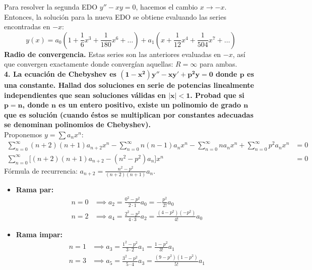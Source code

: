 \documentclass[11pt, a4paper]{article}
\begin{document}
Para resolver la segunda EDO $y''-xy=0$, hacemos el cambio $x \to -x$. Entonces, la solución para la nueva EDO se obtiene evaluando las series encontradas en $-x$:
\[
\boxed{y(x) = a_0\left(1 + \frac{1}{6}x^3 + \frac{1}{180}x^6 + \dots\right) + a_1\left(x + \frac{1}{12}x^4 + \frac{1}{504}x^7 + \dots\right)}
\]
\textbf{Radio de convergencia.} Estas series son las anteriores evaluadas en $-x$, así que convergen exactamente donde convergían aquellas: $R=\infty$ para ambas.\\


\noindent\textbf{4. La ecuación de Chebyshev es $\bm{(1-x^2)y''-xy'+p^2y=0}$ donde $\bm{p}$ es una constante. Hallad dos soluciones en serie de potencias linealmente independientes que sean soluciones válidas en $\bm{|x|<1}$. Probad que si $\bm{p=n}$, donde $\bm{n}$ es un entero positivo, existe un polinomio de grado $\bm{n}$ que es solución (cuando éstos se multiplican por constantes adecuadas se denominan polinomios de Chebyshev).} \\
Proponemos $y = \sum a_n x^n$:
\begin{align*}
\sum_{n=0}^{\infty} (n+2)(n+1)a_{n+2} x^n - \sum_{n=0}^{\infty} n(n-1)a_n x^n - \sum_{n=0}^{\infty} n a_n x^n + \sum_{n=0}^{\infty} p^2 a_n x^n &= 0 \\
\sum_{n=0}^{\infty} \big[ (n+2)(n+1)a_{n+2} - (n^2 - p^2)a_n \big] x^n &= 0
\end{align*}
Fórmula de recurrencia: $a_{n+2} = \frac{n^2-p^2}{(n+2)(n+1)} a_n$.\\
\begin{itemize}
\item \textbf{Rama par:}
\begin{align*}
n=0 &\implies a_2 = \frac{0^2 - p^2}{2\cdot 1} a_0 = -\frac{p^2}{2!} a_0 \\
n=2 &\implies a_4 = \frac{2^2 - p^2}{4\cdot 3} a_2 = \frac{(4 - p^2)(-p^2)}{4!} a_0
\end{align*}
\item \textbf{Rama impar:}
\begin{align*}
n=1 &\implies a_3 = \frac{1^2 - p^2}{3\cdot 2} a_1 = \frac{1 - p^2}{3!} a_1 \\
n=3 &\implies a_5 = \frac{3^2 - p^2}{5\cdot 4} a_3 = \frac{(9 - p^2)(1 - p^2)}{5!} a_1
\end{align*}
\end{itemize}
\end{document}
